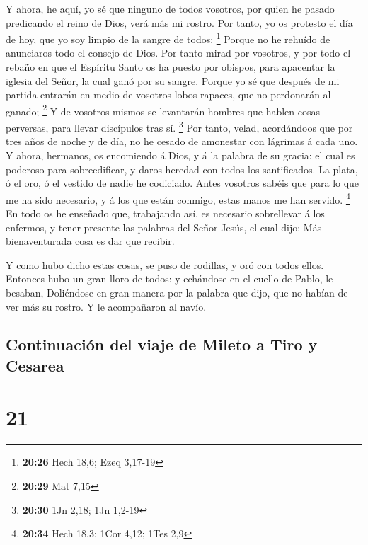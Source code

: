 Y ahora, he aquí, yo sé que ninguno de todos vosotros, por
quien he pasado predicando el reino de Dios, verá más mi rostro.
 Por tanto, yo os protesto el día de hoy, que yo soy limpio
de la sangre de todos: \footnote{\textbf{20:26} Hech 18,6; Ezeq 3,17-19}
 Porque no he rehuído de anunciaros todo el consejo de
Dios.  Por tanto mirad por vosotros, y por todo el rebaño
en que el Espíritu Santo os ha puesto por obispos, para apacentar la
iglesia del Señor, la cual ganó por su sangre.  Porque yo
sé que después de mi partida entrarán en medio de vosotros lobos
rapaces, que no perdonarán al ganado; \footnote{\textbf{20:29} Mat 7,15}
 Y de vosotros mismos se levantarán hombres que hablen
cosas perversas, para llevar discípulos tras sí. \footnote{\textbf{20:30}
  1Jn 2,18; 1Jn 1,2-19}  Por tanto, velad, acordándoos que
por tres años de noche y de día, no he cesado de amonestar con lágrimas
á cada uno.  Y ahora, hermanos, os encomiendo á Dios, y á
la palabra de su gracia: el cual es poderoso para sobreedificar, y daros
heredad con todos los santificados.  La plata, ó el oro, ó
el vestido de nadie he codiciado.  Antes vosotros sabéis
que para lo que me ha sido necesario, y á los que están conmigo, estas
manos me han servido. \footnote{\textbf{20:34} Hech 18,3; 1Cor 4,12;
  1Tes 2,9}  En todo os he enseñado que, trabajando así, es
necesario sobrellevar á los enfermos, y tener presente las palabras del
Señor Jesús, el cual dijo: Más bienaventurada cosa es dar que recibir.

 Y como hubo dicho estas cosas, se puso de rodillas, y oró
con todos ellos.  Entonces hubo un gran lloro de todos: y
echándose en el cuello de Pablo, le besaban,  Doliéndose en
gran manera por la palabra que dijo, que no habían de ver más su rostro.
Y le acompañaron al navío.

\hypertarget{continuaciuxf3n-del-viaje-de-mileto-a-tiro-y-cesarea}{%
\subsection{Continuación del viaje de Mileto a Tiro y
Cesarea}\label{continuaciuxf3n-del-viaje-de-mileto-a-tiro-y-cesarea}}

\hypertarget{section-20}{%
\section{21}\label{section-20}}

